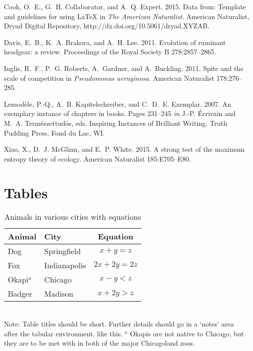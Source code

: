 \documentclass[11pt]{article}
\begin{document}
\begin{thebibliography}{}

Cook, O.~E., G.~H. Collaborator, and A.~Q. Expert. 2015.
\newblock Data from: Template and guidelines for using \LaTeX{} in \textit{The American Naturalist}.
\newblock American Naturalist, Dryad Digital Repository, http://dx.doi.org/10.5061/dryad.XYZAB.

Davis, E.~B., K.~A. Brakora, and A.~H. Lee. 2011.
\newblock Evolution of ruminant headgear: a review.
\newblock Proceedings of the Royal Society B 278:2857--2865.

Inglis, R.~F., P.~G. Roberts, A.~Gardner, and A.~Buckling. 2011.
\newblock Spite and the scale of competition in \textit{Pseudomonas
  aeruginosa}.
\newblock American Naturalist 178:276--285.

Lemod\`{e}le, P.-Q., A.~B. Kapitelschreiber, and C.~D.~E. Exemplar. 2007.
\newblock An exemplary instance of chapters in books.
\newblock Pages 231--245 \emph{in} J.-P. \'{E}crivain and M.~A. Term\'{e}szettud\'{o}s, eds. Inspiring Instances of Brilliant Writing. Truth Pudding Press, Fond du Lac, WI.

Xiao, X., D.~J. McGlinn, and E.~P. White. 2015.
\newblock A strong test of the maximum entropy theory of ecology.
\newblock American Naturalist 185:E705--E80.

\end{thebibliography}

\newpage{}

\section*{Tables}
\renewcommand{\thetable}{\arabic{table}}
\setcounter{table}{0}

\begin{table}[h]
\caption{Animals in various cities with equations}
\label{Table:Okapi}
\centering
\begin{tabular}{llc}\hline
Animal    & City         & Equation \\ \hline
Dog       & Springfield  & $x+y=z$ \\
Fox       & Indianapolis & $2x+2y=2z$ \\
Okapi$^a$ & Chicago      & $x-y<z$ \\
Badger    & Madison      & $x+2y>z$ \\ \hline
\end{tabular}
\bigskip{}
\\
{\footnotesize Note: Table titles should be short. Further details should go in a `notes' area after the tabular environment, like this. $^a$ Okapis are not native to Chicago, but they are to be met with in both of the major Chicagoland zoos.}
\end{table}
\end{document}
